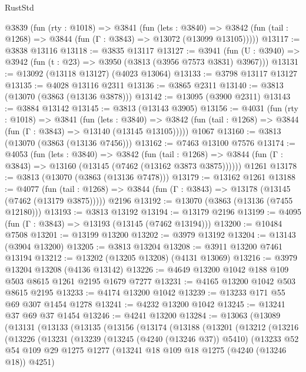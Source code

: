 \begin{lexlean}{RustStd}
\begin{coremodule}
  @3839
    (fun (rty : @1018) =>
    @3841
      (fun (lets : @3840) =>
      @3842 (fun (tail : @1268) => @3844 (fun (Γ : @3843) => @13072 (@13099 @13105)))))
@13117 := @3838 @13116
@13118 := @3835 @13117
@13127 := @3941
    (fun (U : @3940) => @3942 (fun (t : @23) => @3950 (@3813 (@3956 @7573 @3831) @3967)))
@13131 := @13092 (@13118 @13127) (@4023 @13064)
@13133 := @3798 @13117 @13127
@13135 := @4028 @13116 @2311
@13136 := @3865 @2311
@13140 := @3813 (@13070 (@3863 (@13136 @3878)))
@13142 := @13095 (@3900 @2311)
@13143 := @3884 @13142
@13145 := @3813 (@13143 @3905)
@13156 := @4031
    (fun (rty : @1018) =>
    @3841
      (fun (lets : @3840) =>
      @3842 (fun (tail : @1268) => @3844 (fun (Γ : @3843) => @13140 (@13145 @13105)))))
    @1067
@13160 := @3813 (@13070 (@3863 (@13136 @7456)))
@13162 := @7463 @13100 @7576
@13174 := @4053
    (fun (lets : @3840) =>
    @3842
      (fun (tail : @1268) =>
      @3844 (fun (Γ : @3843) => @13160 (@13145 (@7462 (@13162 @3873 @3875))))))
    @1261
@13178 := @3813 (@13070 (@3863 (@13136 @7478)))
@13179 := @13162 @1261
@13188 := @4077
    (fun (tail : @1268) => @3844 (fun (Γ : @3843) => @13178 (@13145 (@7462 (@13179 @3875)))))
    @2196
@13192 := @13070 (@3863 (@13136 (@7455 @12180)))
@13193 := @3813 @13192
@13194 := @13179 @2196
@13199 := @4095 (fun (Γ : @3843) => @13193 (@13145 (@7462 @13194)))
@13200 := @10484 @7508
@13201 := @13199 @13200
@13202 := @3979 @13192
@13204 := @13143 (@3904 @13200)
@13205 := @3813 @13204
@13208 := @3911 @13200 @7461 @13194
@13212 := @13202 (@13205 @13208) (@4131 @13069)
@13216 := @3979 @13204 @13208 (@4136 @13142)
@13226 := @4649 @13200 @1042 @188 @109 @503 @8615 @1261 @2195 @1679 @7277
@13231 := @4165 @13200 @1042 @503 @8615 @2195
@13233 := @4174 @13200 @1042
@13239 := @13233 @171 @55 @69 @307 @1454 @1278
@13241 := @4232 @13200 @1042
@13245 := @13241 @37 @69 @37 @1454
@13246 := @4241 @13200
@13284 := @13063
    (@13089
      (@13131
        (@13133
          (@13135
            (@13156
              (@13174
                (@13188
                  (@13201
                    (@13212
                      (@13216
                        (@13226
                          (@13231
                            (@13239
                              (@13245 (@4240 (@13246 @37)) @5410)
                              (@13233
                                @52
                                @54
                                @109
                                @29
                                @1275
                                @1277
                                (@13241 @18 @109 @18 @1275 (@4240 (@13246 @18)) @4251)

\end{coremodule}
\end{lexlean}
